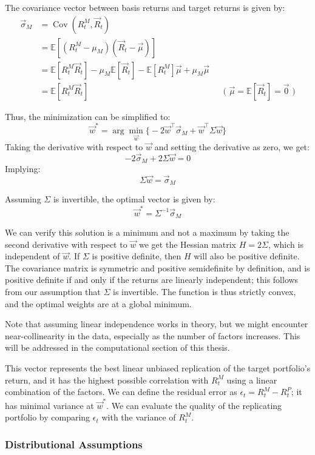 The covariance vector between basis returns and target returns is given by: 
\begin{align*}
    \vec{\sigma}_M &= \operatorname{Cov}(R^M_t, \vec{R}_t) \\
    &= \mathbb{E}[(R^M_t-\mu_M)(\vec{R}_t-\vec{\mu})] \\
    &= \mathbb{E}[R_t^M\vec{R}_t]-\mu_M\mathbb{E}[\vec{R}_t]-\mathbb{E}[R^M_t]\vec{\mu}+\mu_M\vec{\mu} \\
    &= \mathbb{E}[R_t^M\vec{R}_t]
    && \text{( } \vec{\mu}=\mathbb{E}[\vec{R}_t]=\vec{0}\text{ )}
\end{align*}

Thus, the minimization can be simplified to: $$\vec{w}^* = \arg\min_{\vec{w}} \bigl\{ -2\vec{w}^\top\vec{\sigma}_M+\vec{w}^\top\Sigma\vec{w} \bigr\}$$ Taking the derivative with respect to $\vec{w}$ and setting the derivative as zero, we get: $$-2\vec{\sigma}_M+2\Sigma \vec{w}=0$$ Implying: $$\Sigma\vec{w}=\vec{\sigma}_M$$

Assuming $\Sigma$ is invertible, the optimal vector is given by: $$\vec{w}^*=\Sigma^{-1}\vec{\sigma}_M$$

We can verify this solution is a minimum and not a maximum by taking the second derivative with respect to $\vec{w}$ we get the Hessian matrix $H=2\Sigma$, which is independent of $\vec{w}$. If $\Sigma$ is positive definite, then $H$ will also be positive definite. The covariance matrix is symmetric and positive semidefinite by definition, and is positive definite if and only if the returns are linearly independent; this follows from our assumption that $\Sigma$ is invertible. The function is thus strictly convex, and the optimal weights are at a global minimum.

Note that assuming linear independence works in theory, but we might encounter near-collinearity in the data, especially as the number of factors increases. This will be addressed in the computational section of this thesis.

This vector represents the best linear unbiased replication of the target portfolio's return, and it has the highest possible correlation with $R_t^M$ using a linear combination of the factors. We can define the residual error as $\epsilon_t=R_t^M-R_t^P$; it has minimal variance at $\vec{w}^*$. We can evaluate the quality of the replicating portfolio by comparing $\epsilon_t$ with the variance of $R_t^M$.

\subsubsection{Distributional Assumptions}

